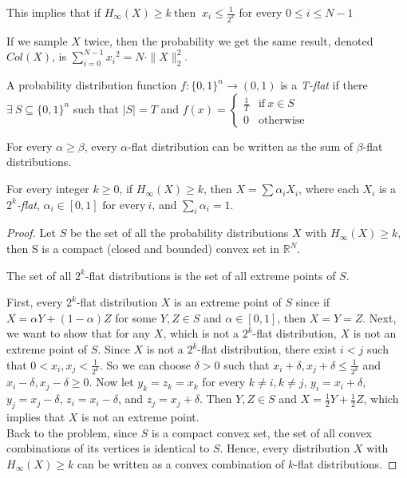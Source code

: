 This implies that if $H_\infty(X) \geq k \ \text{then } \ x_i \leq \frac{1}{2^k} $ for every $0 \leq i \leq N-1$

\begin{theorem}
If we sample $X$ twice, then the probability we get the same result, denoted $Col(X)$, is 
$\sum\limits_{i = 0}^{N-1} {x_i}^2 = N \cdot \| X \|_2^2$.
\end{theorem}

\begin{definition}
A probability distribution function $f \colon \{ 0, 1 \}^n \rightarrow (0,1)$ is a \textit{T-flat} if there $\exists \ S \subseteq \{ 0,1 \}^n$ such that $|S| = T$ and 
$f(x) = 
\begin{cases}
	\frac{1}{T} & \text{if} \ x \in S \\
	0             & \text{otherwise}
\end{cases}$
\end{definition}

\begin{lemma} For every $\alpha \geq \beta$, every $\alpha$-flat distribution can be written as the sum of $\beta$-flat distributions. 
\end{lemma}

\begin{theorem}
For every integer $k \geq 0$, if $H_\infty(X) \geq k$, then 
$X = \sum \alpha_i X_i$, where each $X_i$ is a \textit{$2^k$-flat}, $\alpha_i \in [0,1] \text{ for every} \ i$, and $\sum\limits_i \alpha_i = 1$.
\end{theorem}

\begin{proof}
Let $S$ be the set of all the probability distributions $X$ with $H_{\infty}(X) \geq k$, then S is a compact (closed and bounded) convex set in $\mathbb{R}^N$.
\begin{claim} The set of all $2^k$-flat distributions is the set of all extreme points of $S$.
\end{claim}
First, every $2^k$-flat distribution $X$ is an extreme point of $S$ since if $X = \alpha Y + (1-\alpha)Z$ for some $Y, Z \in S$ and $\alpha\in [0,1]$, then $X = Y = Z$. Next, we want to show that for any $X$, which is not a $2^k$-flat distribution, $X$ is not an extreme point of $S$. Since $X$ is not a $2^k$-flat distribution, there exist $i<j$ such that $0 < x_i, x_j < \frac{1}{2^k}$. So we can choose $\delta > 0$ such that $x_i + \delta, x_j + \delta \leq \frac{1}{2^k}$ and $x_i - \delta, x_j - \delta \geq 0$. Now let $y_k = z_k = x_k$ for every $k \neq i, k \neq j$,  $y_i = x_i + \delta$, $y_j = x_j - \delta$, $z_i = x_i - \delta$, and $z_j = x_j + \delta$. Then $Y, Z \in S$ and $X = \frac{1}{2} Y + \frac{1}{2} Z$, which implies that $X$ is not an extreme point. \\ 
Back to the problem, since $S$ is a compact convex set, the set of all convex combinations of its vertices is identical to $S$. Hence, every distribution $X$ with  $H_{\infty}(X) \geq k$ can be written as a convex combination of $k$-flat distributions. 

\end{proof}

